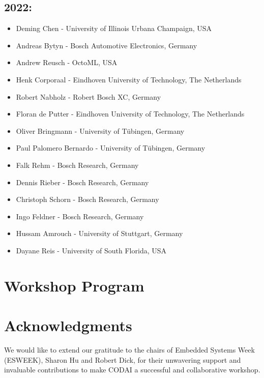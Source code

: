 \documentclass[sigconf]{acmart}
\begin{document}
\subsection*{2022:}
\begin{itemize}
	\item Deming Chen - University of Illinois Urbana Champaign, USA
	\item Andreas Bytyn - Bosch Automotive Electronics, Germany
	\item Andrew Reusch - OctoML, USA
	\item Henk Corporaal - Eindhoven University of Technology, The Netherlands
	\item Robert Nabholz - Robert Bosch XC, Germany
	\item Floran de Putter - Eindhoven University of Technology, The Netherlands
	\item Oliver Bringmann - University of Tübingen, Germany
	\item Paul Palomero Bernardo - University of Tübingen, Germany
	\item Falk Rehm - Bosch Research, Germany
	\item Dennis Rieber - Bosch Research, Germany
	\item Christoph Schorn - Bosch Research, Germany
	\item Ingo Feldner - Bosch Research, Germany
	\item Hussam Amrouch - University of Stuttgart, Germany
	\item Dayane Reis - University of South Florida, USA
\end{itemize}


\section{Workshop Program}

\section{Acknowledgments}
We would like to extend our gratitude to the chairs of Embedded Systems Week (ESWEEK), Sharon Hu and Robert Dick, for their unwavering support and invaluable contributions to make CODAI a successful and collaborative workshop.




\end{document}
